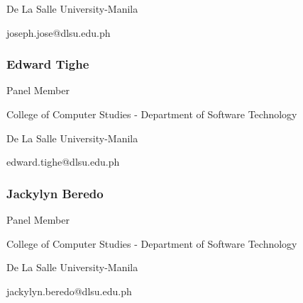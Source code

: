 De La Salle University-Manila

joseph.jose@dlsu.edu.ph

\subsubsection{Edward Tighe}
Panel Member

College of Computer Studies - Department of Software Technology

De La Salle University-Manila

edward.tighe@dlsu.edu.ph

\subsubsection{Jackylyn Beredo}
Panel Member

College of Computer Studies - Department of Software Technology

De La Salle University-Manila

jackylyn.beredo@dlsu.edu.ph